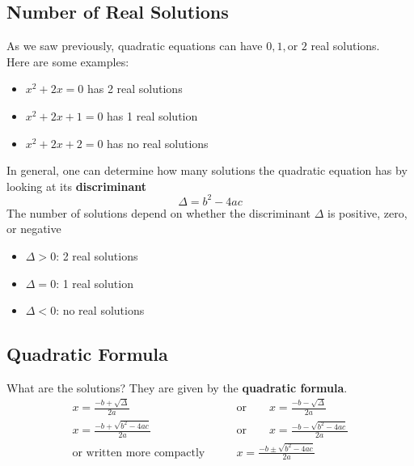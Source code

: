 \documentclass{article}
\begin{document}
\subsection{Number of Real Solutions}
As we saw previously, quadratic equations can have $0,1,\text{or }2$ real solutions. \\[0pt]Here are some examples:
\begin{itemize}
    \item $x^2 + 2x = 0$ has 2 real solutions
    \item $x^2 + 2x + 1 = 0$ has 1 real solution
    \item $x^2 + 2x + 2 = 0$ has no real solutions
\end{itemize}
In general, one can determine how many solutions the quadratic equation has by looking at its \textbf{discriminant}
$$\Delta = b^2 - 4ac$$
The number of solutions depend on whether the discriminant $\Delta$ is positive, zero, or negative
\begin{itemize}
    \item $\Delta > 0$: 2 real solutions
    \item $\Delta = 0$: 1 real solution
    \item $\Delta < 0$: no real solutions
\end{itemize}
\subsection{Quadratic Formula}
What are the solutions? They are given by the \textbf{quadratic formula}.
\begin{align}
    x = \frac{-b + \sqrt{\Delta}}{2a} \qquad &\text{or} \qquad x = \frac{-b - \sqrt{\Delta}}{2a} \\[10pt]
    x = \frac{-b + \sqrt{b^2 - 4ac}}{2a} \qquad &\text{or} \qquad x = \frac{-b - \sqrt{b^2 - 4ac}}{2a}\\[10pt]
    \text{or written more compactly}\qquad  &  x = \frac{-b \pm \sqrt{b^2 - 4ac}}{2a}
\end{align}
\end{document}
